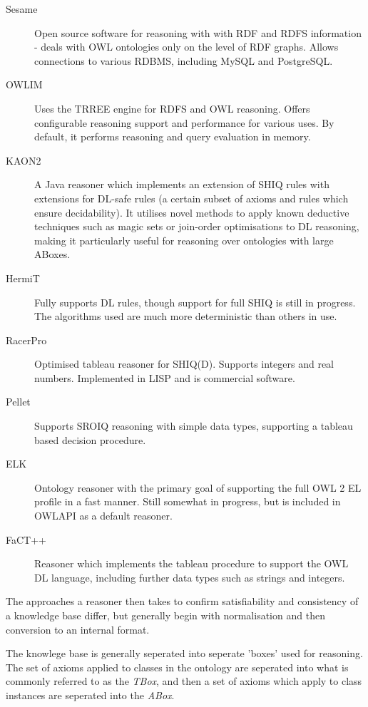 \documentclass{article}
\begin{document}
\begin{description}
    \item[Sesame] Open source software for reasoning with with RDF and RDFS
    information\cite{sesame} - deals with OWL ontologies only on the level of RDF graphs.
    Allows connections to various RDBMS, including MySQL and PostgreSQL.
    \item[OWLIM] Uses the TRREE engine for RDFS and OWL reasoning. Offers
    configurable reasoning support and performance for various uses. By default,
    it performs reasoning and query evaluation in memory.\cite{owlim}
    \item[KAON2] A Java reasoner which implements an extension of SHIQ rules with
    extensions for DL-safe rules (a certain subset of axioms and rules which
    ensure decidability).\cite{kaon} It utilises novel methods to apply known
    deductive techniques such as magic sets or join-order optimisations
    to DL reasoning, making it particularly useful for reasoning over ontologies
    with large ABoxes.\cite{kaonabox}
    \item[HermiT] Fully supports DL rules, though support for full SHIQ is still
    in progress. The algorithms used are much more deterministic than others in
    use.\cite{hermit}
    \item[RacerPro] Optimised tableau reasoner for SHIQ(D). Supports integers
    and real numbers. Implemented in LISP and is commercial
    software.\cite{racerpro}
    \item[Pellet] Supports SROIQ reasoning with simple data types, supporting a
    tableau based decision procedure.\cite{pellet}
    \item[ELK] Ontology reasoner with the primary goal of supporting the full
    OWL 2 EL profile in a fast manner. Still somewhat in progress, but is included
    in OWLAPI as a default reasoner.\cite{elk}
    \item[FaCT++] Reasoner which implements the tableau procedure to support the
    OWL DL language, including further data types such as strings and
    integers.\cite{fact}
\end{description}

The approaches a reasoner then takes to confirm satisfiability and consistency of
a knowledge base differ, but generally begin with normalisation and then
conversion to an internal format. 

The knowlege base is generally seperated into seperate 'boxes' used for
reasoning. The set of axioms applied to classes in the ontology are seperated
into what is commonly referred to as the \emph{TBox}, and then a set of axioms
which apply to class instances are seperated into the \emph{ABox}. 
\end{document}
